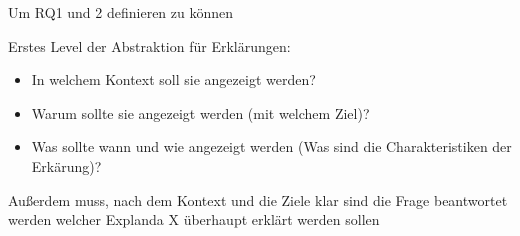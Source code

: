 Um RQ1 und 2 definieren zu können

Erstes Level der Abstraktion für Erklärungen:

\begin{itemize}
    \item In welchem Kontext soll sie angezeigt werden? \cite{kohl_explainability_2019, chazette_knowledge_nodate}
    \item Warum sollte sie angezeigt werden (mit welchem Ziel)? \cite{kohl_explainability_2019, rosenfeld_explainability_2019}
    \item Was sollte wann und wie angezeigt werden (Was sind die Charakteristiken der Erkärung)? \cite{kohl_explainability_2019, rosenfeld_explainability_2019}
\end{itemize}



Außerdem muss, nach dem Kontext und die Ziele klar sind die Frage beantwortet werden welcher Explanda X überhaupt erklärt werden sollen \cite{kohl_explainability_2019}






